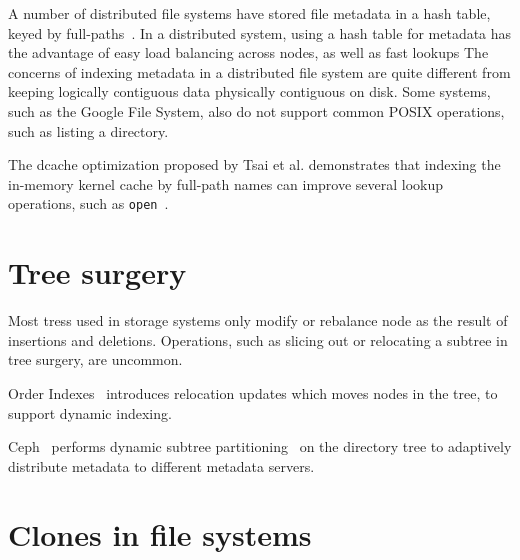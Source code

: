 A number of distributed file systems have stored file metadata in a hash table,
keyed by full-paths~\citep{gfs,nsidw,rdfs}.
In a distributed system, using a hash table for metadata has the advantage of
easy load balancing across nodes, as well as fast lookups
The concerns of indexing metadata in a distributed file system are quite
different from keeping logically contiguous data physically contiguous on disk.
Some systems, such as the Google File System, also do not support common POSIX
operations, such as listing a directory.

The dcache optimization proposed by Tsai et al. demonstrates that
indexing the in-memory kernel cache by full-path names can improve several
lookup operations, such as \texttt{open}~\citep{dcache}.

\section{Tree surgery}

Most tress used in storage systems only modify or rebalance node as the result
of insertions and deletions.
Operations, such as slicing out or relocating a subtree in tree surgery,
are uncommon.

Order Indexes~\citep{orderindex} introduces relocation updates which moves nodes
in the tree, to support dynamic indexing.

Ceph~\citep{ceph} performs dynamic subtree partitioning~\citep{cephtree} on the
directory tree to adaptively distribute metadata to different metadata servers.

\section{Clones in file systems}

